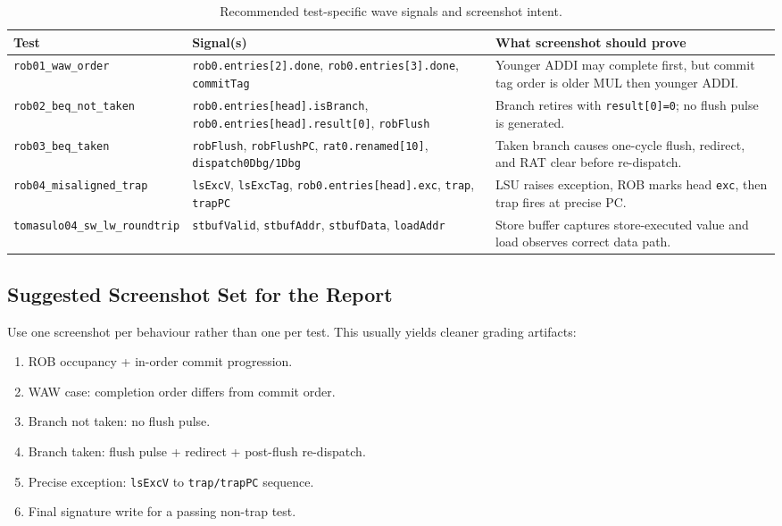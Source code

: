 \documentclass[11pt]{article}
\begin{document}
\begin{table}[h]
  \centering
  \small
  \begin{tabular}{p{3.3cm} p{4.6cm} p{6.1cm}}
    \toprule
    \textbf{Test}                          & \textbf{Signal(s)}                                                                                  & \textbf{What screenshot should prove}                                                 \\
    \midrule
    \texttt{rob01\_waw\_order}             & \texttt{rob0.entries[2].done}, \texttt{rob0.entries[3].done}, \texttt{commitTag}                    & Younger ADDI may complete first, but commit tag order is older MUL then younger ADDI. \\
    \texttt{rob02\_beq\_not\_taken}        & \texttt{rob0.entries[head].isBranch}, \texttt{rob0.entries[head].result[0]}, \texttt{robFlush}      & Branch retires with \texttt{result[0]=0}; no flush pulse is generated.                \\
    \texttt{rob03\_beq\_taken}             & \texttt{robFlush}, \texttt{robFlushPC}, \texttt{rat0.renamed[10]}, \texttt{dispatch0Dbg/1Dbg}       & Taken branch causes one-cycle flush, redirect, and RAT clear before re-dispatch.      \\
    \texttt{rob04\_misaligned\_trap}       & \texttt{lsExcV}, \texttt{lsExcTag}, \texttt{rob0.entries[head].exc}, \texttt{trap}, \texttt{trapPC} & LSU raises exception, ROB marks head \texttt{exc}, then trap fires at precise PC.     \\
    \texttt{tomasulo04\_sw\_lw\_roundtrip} & \texttt{stbufValid}, \texttt{stbufAddr}, \texttt{stbufData}, \texttt{loadAddr}                      & Store buffer captures store-executed value and load observes correct data path.       \\
    \bottomrule
  \end{tabular}
  \caption{Recommended test-specific wave signals and screenshot intent.}
  \label{tbl:waveform_specific}
\end{table}

\subsection{Suggested Screenshot Set for the Report}

Use one screenshot per behaviour rather than one per test. This usually yields
cleaner grading artifacts:
\begin{enumerate}[noitemsep]
  \item ROB occupancy + in-order commit progression.
  \item WAW case: completion order differs from commit order.
  \item Branch not taken: no flush pulse.
  \item Branch taken: flush pulse + redirect + post-flush re-dispatch.
  \item Precise exception: \texttt{lsExcV} to \texttt{trap/trapPC} sequence.
  \item Final signature write for a passing non-trap test.
\end{enumerate}
\end{document}
